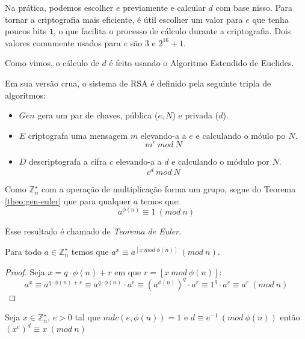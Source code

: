 Na prática, podemos escolher $e$ previamente e calcular $d$ com base nisso.
Para tornar a criptografia mais eficiente, é útil escolher um valor para $e$ que tenha poucos bits {\tt 1}, o que facilita o processo de cálculo durante a criptografia.
Dois valores comumente usados para $e$ são $3$ e $2^{16} + 1$.

Como vimos, o cálculo de $d$ é feito usando o Algoritmo Estendido de Euclides.



Em sua versão crua, o sistema de RSA é definido pela seguinte tripla de algoritmos:

\begin{itemize}
\item $Gen$ gera um par de chaves, pública ($e, N$) e privada ($d$).
\item $E$ criptografa uma mensagem $m$ elevando-a a $e$ e calculando o móulo po $N$.
  \begin{displaymath}
    m^e\ mod\ N
  \end{displaymath}
\item $D$ descriptografa a cifra $c$ elevando-a a $d$ e calculando o módulo por $N$.
  \begin{displaymath}
    c^d\ mod\ N
  \end{displaymath}
\end{itemize}

Como $\mathbb{Z}_n^\star$ com a operação de multiplicação forma um grupo, segue do Teorema \ref{theo:gen-euler} que para qualquer $a$ temos que:
\begin{displaymath}
  a^{\phi(n)} \equiv 1\ (mod\ n)
\end{displaymath}

Esse resultado é chamado de {\em Teorema de Euler}.

\begin{corollary}
  Para todo $a \in \mathbb{Z}_n^\star$ temos que $a^x \equiv a^{[x\ mod\ \phi(n)]}\ (mod\ n)$.
\end{corollary}
\begin{proof}
  Seja $x = q \cdot \phi(n) + r$ em que $r = [x\ mod\ \phi(n)]$:
  \begin{displaymath}
    a^x \equiv a^{q \cdot \phi(n) + r} \equiv a^{q \cdot \phi(n)} \cdot a^r \equiv (a^{\phi(n)})^q \cdot a^r \equiv 1^q \cdot a^r \equiv a^r\ (mod\ n)
  \end{displaymath}
\end{proof}


\begin{corollary}
\label{cor:euler}
Seja $x \in \mathbb{Z}_n^\star$, $e > 0$ tal que $mdc(e, \phi(n)) = 1$ e $d \equiv e^{-1}\ (mod\ \phi(n))$ então $(x^e)^d \equiv x\ (mod\ n)$
\end{corollary}

